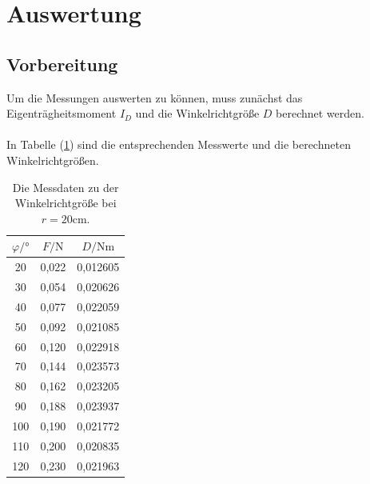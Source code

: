 \section{Auswertung}
\label{sec:Auswertung}

\subsection{Vorbereitung}\label{subsec:Vorbereitung}
Um die Messungen auswerten zu können, muss zunächst das Eigenträgheitsmoment $I_{D}$ und die Winkelrichtgröße $D$ berechnet werden.\\
\\

In Tabelle (\ref{tab:Winkelrichtgröße}) sind die entsprechenden Messwerte und die berechneten Winkelrichtgrößen.

\begin{table}
\centering
\caption{Die Messdaten zu der Winkelrichtgröße bei $r = 20 \unit{\centi\meter}$.}
\label{tab:Winkelrichtgröße}
\begin{tabular}{c c c}
  \toprule
  $\varphi / °$  &  $F / \unit\newton$ & $D / \unit{\newton\meter}$ \\
  \midrule
              20 &        0,022 &     0,012605 \\
              30 &        0,054 &     0,020626 \\
              40 &        0,077 &     0,022059 \\
              50 &        0,092 &     0,021085 \\
              60 &        0,120 &     0,022918 \\
              70 &        0,144 &     0,023573 \\
              80 &        0,162 &     0,023205 \\
              90 &        0,188 &     0,023937 \\
             100 &        0,190 &     0,021772 \\
             110 &        0,200 &     0,020835 \\
             120 &        0,230 &     0,021963 \\
  \bottomrule
\end{tabular}
\end{table}

